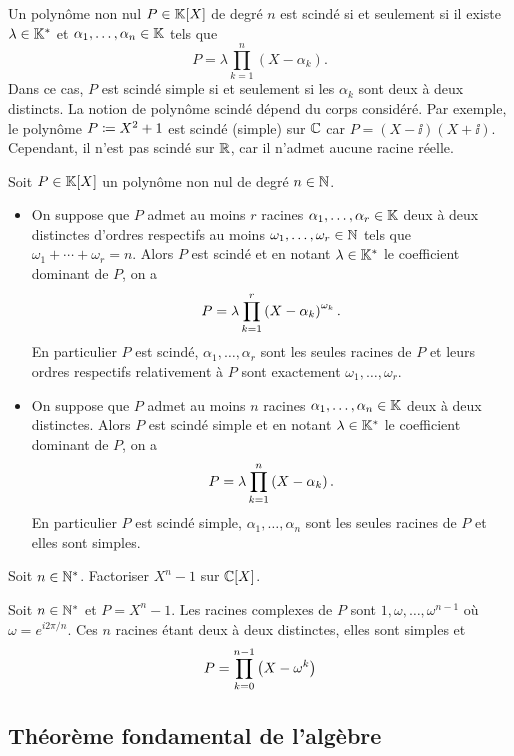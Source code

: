\documentclass{magnolia}
\begin{document}
\begin{remarques}
\remarque Un polynôme non nul $P\in\polyK$ de degré $n$ est scindé si et seulement si il existe
  $\lambda\in\mathbb{K}^*$ et $\alpha_1,\ldots,\alpha_n\in\mathbb{K}$ tels que
  \[P=\lambda \prod_{k=1}^n (X-\alpha_k).\]
  Dans ce cas, $P$ est scindé simple si et seulement si les $\alpha_k$ sont deux à deux distincts.
\remarque La notion de polynôme scindé dépend du corps considéré. Par exemple,
  le polynôme $P\coloneqq X^2+1$ est scindé (simple) sur $\mathbb{C}$ car $P=(X-\ii)(X+\ii)$. Cependant, il
  n'est pas scindé sur $\mathbb{R}$, car il n'admet aucune racine réelle.
\end{remarques}

\begin{proposition}
Soit $P\in\polyK$ un polynôme non nul de degré $n\in\mathbb{N}$.
\begin{itemize}
\item On suppose que
$P$ admet au moins $r$ racines $\alpha_1,\ldots,\alpha_r\in\mathbb{K}$ deux à deux distinctes d'ordres
respectifs au moins $\omega_1,\ldots,\omega_r\in\mathbb{N}$ tels que $\omega_1+\cdots+\omega_r=n$.
Alors $P$ est scindé et en notant  $\lambda\in\mathbb{K}^*$ le coefficient dominant de $P$, on a
\[P=\lambda\prod_{k=1}^r \left(X-\alpha_k\right)^{\omega_k}.\]
En particulier $P$ est scindé, $\alpha_1,\ldots,\alpha_r$ sont les seules racines
de $P$ et leurs ordres respectifs relativement à $P$ sont exactement
$\omega_1,\ldots,\omega_r$.
\item On suppose que
$P$ admet au moins $n$ racines $\alpha_1,\ldots,\alpha_n\in\mathbb{K}$ deux à deux distinctes. Alors
$P$ est scindé simple et en notant $\lambda\in\mathbb{K}^*$ le coefficient dominant de $P$,
on a
\[P=\lambda\prod_{k=1}^n \left(X-\alpha_k\right).\]
En particulier $P$ est scindé simple, $\alpha_1,\ldots,\alpha_n$ sont les seules
racines de $P$ et elles sont simples.
\end{itemize}
\end{proposition}

\begin{exoUnique}
\exo Soit $n\in{\mathbb{N}^*}$. Factoriser $X^n-1$ sur $\polyC$.
  \begin{sol}
  Soit $n\in{\mathbb{N}^*}$ et $P=X^n-1$. Les racines complexes de $P$ sont
  $1,\omega,\ldots,\omega^{n-1}$ où $\omega=e^{i2\pi/n}$. Ces $n$ racines étant
  deux à deux distinctes, elles sont simples et
  \[P=\prod_{k=0}^{n-1} \left(X-\omega^k\right)\]  
  \end{sol}
\end{exoUnique}


\subsection{Théorème fondamental de l'algèbre}
\end{document}
